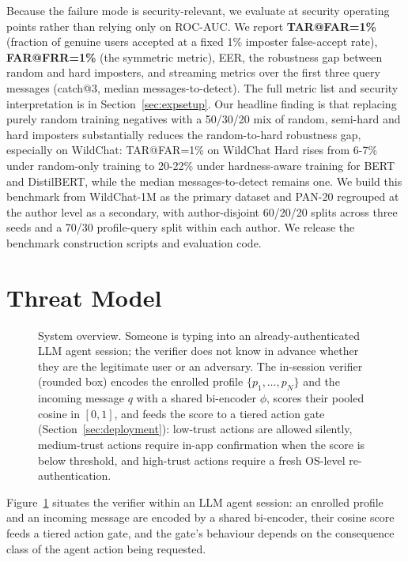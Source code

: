 \documentclass[11pt]{article}
\begin{document}
Because the failure mode is security-relevant, we evaluate at security operating points rather than relying only on ROC-AUC. We report \textbf{TAR@FAR=1\%} (fraction of genuine users accepted at a fixed 1\% imposter false-accept rate), \textbf{FAR@FRR=1\%} (the symmetric metric), EER, the robustness gap between random and hard imposters, and streaming metrics over the first three query messages (catch@3, median messages-to-detect). The full metric list and security interpretation is in Section~\ref{sec:expsetup}. Our headline finding is that replacing purely random training negatives with a 50/30/20 mix of random, semi-hard and hard imposters substantially reduces the random-to-hard robustness gap, especially on WildChat: TAR@FAR=1\% on WildChat Hard rises from 6-7\% under random-only training to 20-22\% under hardness-aware training for BERT and DistilBERT, while the median messages-to-detect remains one. We build this benchmark from WildChat-1M \citep{zhao2024wildchat} as the primary dataset and PAN-20 \citep{bevendorff2020overview} regrouped at the author level as a secondary, with author-disjoint 60/20/20 splits across three seeds and a 70/30 profile-query split within each author. We release the benchmark construction scripts and evaluation code.

\section{Threat Model}
\label{sec:threat}

\begin{figure}[t]
\centering
\resizebox{0.95\textwidth}{!}{}
\caption{System overview. Someone is typing into an already-authenticated LLM agent session; the verifier does not know in advance whether they are the legitimate user or an adversary. The in-session verifier (rounded box) encodes the enrolled profile $\{p_1,\dots,p_N\}$ and the incoming message $q$ with a shared bi-encoder $\phi$, scores their pooled cosine in $[0,1]$, and feeds the score to a tiered action gate (Section~\ref{sec:deployment}): low-trust actions are allowed silently, medium-trust actions require in-app confirmation when the score is below threshold, and high-trust actions require a fresh OS-level re-authentication.}
\label{fig:system_overview}
\end{figure}

Figure~\ref{fig:system_overview} situates the verifier within an LLM agent session: an enrolled profile and an incoming message are encoded by a shared bi-encoder, their cosine score feeds a tiered action gate, and the gate's behaviour depends on the consequence class of the agent action being requested.
\end{document}

